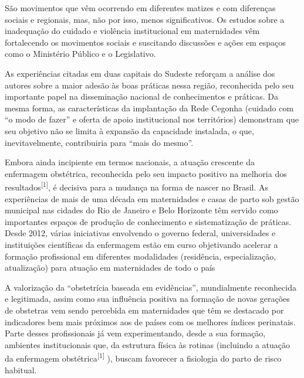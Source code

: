 \documentclass{article}
\begin{document}
São movimentos que vêm ocorrendo em diferentes matizes e com diferenças sociais
e regionais,
mas, não por isso, menos significativos. Os estudos sobre a inadequação do
cuidado e violência
institucional em maternidades vêm fortalecendo os movimentos sociais e
suscitando discussões e
ações em espaços como o Ministério Público e o Legislativo.

As experiências citadas em duas capitais do Sudeste reforçam a análise dos
autores sobre a
maior adesão às boas práticas nessa região, reconhecida pelo seu importante
papel na
disseminação nacional de conhecimentos e práticas. Da mesma forma, as
características da
implantação da Rede Cegonha (cuidado com “o modo de fazer” e oferta de apoio
institucional nos
territórios) demonstram que seu objetivo não se limita à expansão da capacidade
instalada, o
que, inevitavelmente, contribuiria para “mais do mesmo”.

Embora ainda incipiente em termos nacionais, a atuação crescente da enfermagem
obstétrica,
reconhecida pelo seu impacto positivo na melhoria dos resultados\textsuperscript{[}\textsuperscript{1}\textsuperscript{]}, é decisiva para a mudança na forma de nascer no Brasil. As
experiências de mais de uma década em maternidades e casas de parto sob gestão
municipal nas
cidades do Rio de Janeiro e Belo Horizonte têm servido como importantes espaços
de produção de
conhecimento e sistematização de práticas. Desde 2012, várias iniciativas
envolvendo o governo
federal, universidades e instituições científicas da enfermagem estão em curso
objetivando
acelerar a formação profissional em diferentes modalidades (residência,
especialização,
atualização) para atuação em maternidades de todo o país

A valorização da “obstetrícia baseada em evidências”, mundialmente reconhecida e
legitimada,
assim como sua influência positiva na formação de novas gerações de obstetras
vem sendo
percebida em maternidades que têm se destacado por indicadores bem mais próximos
aos de países
com os melhores índices perinatais. Parte desses profissionais já vem
experimentando, desde a
sua formação, ambientes institucionais que, da estrutura física às rotinas
(incluindo a
atuação da enfermagem obstétrica\textsuperscript{[}\textsuperscript{1}\textsuperscript{]}
), buscam
favorecer a fisiologia do parto de risco habitual.
\end{document}
